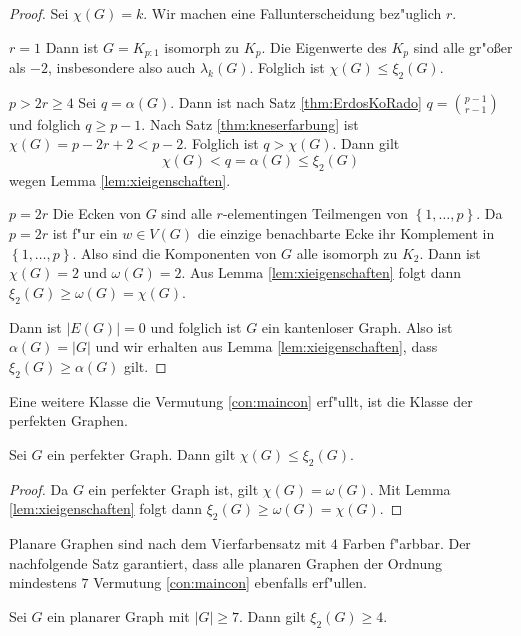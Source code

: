 \begin{proof}
  Sei $\chi(G) = k$. Wir machen eine Fallunterscheidung bez"uglich $r$.

   {$r=1$} Dann ist $G=K_{p:1}$ isomorph zu $K_p$. Die Eigenwerte des $K_p$ sind alle gr"o{\ss}er als $-2$, insbesondere also auch $\lambda_{k}(G)$. Folglich ist $\chi(G) \leq \xi_{2}(G)$. 

   {$p > 2r \geq 4 $} Sei $q = \alpha(G)$.  Dann ist nach Satz \ref{thm:ErdosKoRado} $ q = \binom{p-1}{r-1}$ und folglich $ q \geq p-1$. Nach Satz \ref{thm:kneserfarbung} ist $\chi(G) = p-2r+2 < p-2$. Folglich ist $q > \chi(G)$. 
  Dann gilt $$\chi(G) < q = \alpha(G) \leq \xi_{2}(G) $$ wegen Lemma \ref{lem:xieigenschaften}.

   {$ p = 2r $} Die Ecken von $G$ sind alle $r$-elementingen Teilmengen von $\left\{ 1,\dots,p \right\}$. Da $p=2r$ ist f"ur ein $w\in V(G)$ die einzige benachbarte Ecke ihr Komplement in $\left\{ 1,\dots,p \right\}$. Also sind die Komponenten von $G$ alle isomorph zu $K_{2}$. Dann ist $\chi(G) = 2$ und $\omega(G) = 2$. 
  Aus Lemma \ref{lem:xieigenschaften} folgt dann $\xi_{2}(G) \geq \omega(G) = \chi(G)$.

   Dann ist $|E(G)| = 0$ und folglich ist $G$ ein kantenloser Graph. Also ist $\alpha(G) = |G|$ und wir erhalten aus Lemma \ref{lem:xieigenschaften}, dass $\xi_{2}(G) \geq \alpha(G)$ gilt.
\end{proof}
Eine weitere Klasse die Vermutung \ref{con:maincon} erf"ullt, ist die Klasse der perfekten Graphen.

\begin{proposition}
  Sei $G$ ein perfekter Graph. Dann gilt 
  $\chi(G) \leq \xi_{2}(G)$.
\end{proposition}

\begin{proof}
  Da $G$ ein perfekter Graph ist, gilt $\chi(G) = \omega(G)$. 
  Mit Lemma \ref{lem:xieigenschaften} folgt dann $\xi_2(G) \geq \omega(G) = \chi(G)$.
\end{proof}

Planare Graphen sind nach dem Vierfarbensatz  mit $4$ Farben f"arbbar. Der nachfolgende Satz garantiert, dass alle planaren Graphen der Ordnung mindestens $7$ Vermutung \ref{con:maincon} ebenfalls erf"ullen.
\begin{proposition}
  Sei $G$ ein planarer Graph mit $|G| \geq 7$. Dann gilt $\xi_{2}(G) \geq 4$.
  \label{prop:planaregraphen}
\end{proposition}

